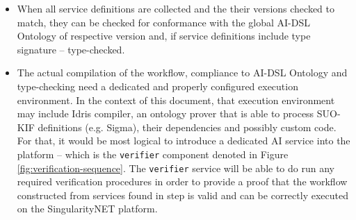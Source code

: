 \documentclass[]{report}
\begin{document}
\begin{enumerate}
\begin{itemize}
	\begin{figure}[h]
		\centering
		\begin{verbatim}
		{
			"sender": "uclnlp",
			"receiver": "fakeNewsScore",
			"upper-ai-dsl-ontology": "v0.1",
			"service-metadata": $(include sevice_definition.json),
			"leaf-ontology": $(include uclnlp.kif)
		}
		\end{verbatim}
		\vspace{-0.3cm}
		\captionsetup{width=0.8\linewidth}
		\caption{\label{lst:uclnlp_metadata}Metadata of the \texttt{uclnlp} service. Sample contents 
			of included files can be seen separately for each  
			\href{https://gitlab.com/nunet/fake-news-detection/uclnlp/-/blob/master/service/service_spec/service_definition_prod.json}{service\_definition.json}
			and \href{https://github.com/singnet/ai-dsl/blob/master/ontology/uclnlp.kif}{uclnlp.kif}.
		}
	\end{figure}

	\item When all service definitions are collected and the their versions checked to match, 
	they can be checked for conformance with the global AI-DSL Ontology of respective version and,
	if service definitions include type signature -- type-checked.
	
	\item The actual compilation of the workflow, compliance to AI-DSL Ontology and type-checking need a
	dedicated and properly configured execution environment. In the context of this document, 
	that execution environment may include Idris compiler, an ontology prover that is able to process 
	SUO-KIF definitions (e.g. Sigma), their dependencies and possibly custom code.
	For that, it would be most logical to introduce a dedicated 
	AI service into the platform -- which is the \texttt{verifier} component denoted in Figure 
	\ref{fig:verification-sequence}. The \texttt{verifier} service will be able to do run any required
	verification procedures in order to provide a proof that the workflow constructed from 
	services found in step  is valid and can be correctly executed on the 
	SingularityNET platform.
	

\end{itemize}
\end{enumerate}
\end{document}
